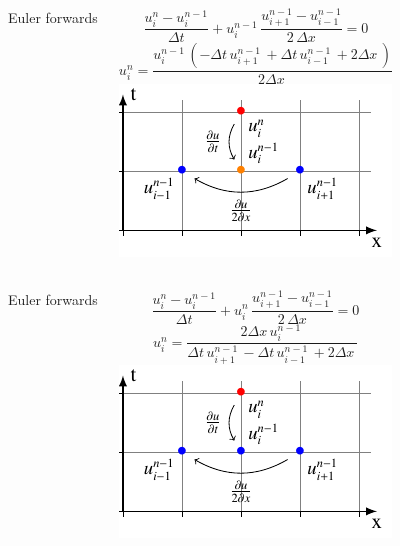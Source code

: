 \begin{frame}
  \begin{columns}
    Euler forwards

  $$\frac{u_{i}^{n}-u_{i}^{n-1}}{\Delta t}+ u_{i}^{n-1}\, \frac{u_{i+1}^{n-1}-u_{i-1}^{n-1}}{2\,\Delta x}=0$$
  $$ u_{i}^{n} = \frac{u^{n-1}_{i}\, \left(- \Delta{t}\, u^{n-1}_{i+1}\, + \Delta{t}\, u^{n-1}_{i-1}\, + 2 \Delta{x}\,\right)}{2 \Delta{x}\,}$$
    \includegraphics[height=\textheight]{../BurgersEquation/tikz/linear3/linear3.pdf}\\
  \end{columns}
\end{frame}

\begin{frame}
  \begin{columns}
    Euler forwards

  $$\frac{u_{i}^{n}-u_{i}^{n-1}}{\Delta t}+ u_{i}^{n}\, \frac{u_{i+1}^{n-1}-u_{i-1}^{n-1}}{2\,\Delta x}=0$$
  $$ u_{i}^{n} = \frac{2 \Delta{x}\, u^{n-1}_{i}\,}{\Delta{t}\, u^{n-1}_{i+1}\, - \Delta{t}\, u^{n-1}_{i-1}\, + 2 \Delta{x}\,}$$
    \includegraphics[height=\textheight]{../BurgersEquation/tikz/linear4/linear4.pdf}\\
  \end{columns}
\end{frame}

